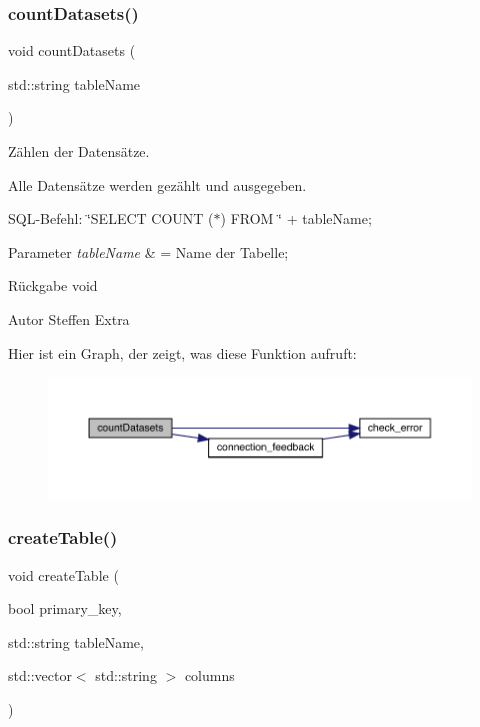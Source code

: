 \subsubsection{count\+Datasets()}
{\footnotesize\ttfamily void count\+Datasets (\begin{DoxyParamCaption}\item[{std\+::string}]{table\+Name }\end{DoxyParamCaption})}



Zählen der Datensätze. 

Alle Datensätze werden gezählt und ausgegeben.~\newline


S\+Q\+L-\/\+Befehl\+: \char`\"{}\+S\+E\+L\+E\+C\+T C\+O\+U\+N\+T ($\ast$) F\+R\+O\+M \char`\"{} + table\+Name;


\begin{DoxyParams}{Parameter}
{\em table\+Name} & = Name der Tabelle;\\
\hline
\end{DoxyParams}
\begin{DoxyReturn}{Rückgabe}
void
\end{DoxyReturn}
\begin{DoxyAuthor}{Autor}
Steffen Extra 
\end{DoxyAuthor}
Hier ist ein Graph, der zeigt, was diese Funktion aufruft\+:\nopagebreak
\begin{figure}[H]
\begin{center}
\leavevmode
\includegraphics[width=350pt]{tables_8hpp_ad2178bf4577d7eea6caebd8d1c942088_cgraph}
\end{center}
\end{figure}
\mbox{\label{tables_8hpp_a018659fc814b4a097c4b4862f42fe554}} 
\subsubsection{create\+Table()}
{\footnotesize\ttfamily void create\+Table (\begin{DoxyParamCaption}\item[{bool}]{primary\+\_\+key,  }\item[{std\+::string}]{table\+Name,  }\item[{std\+::vector$<$ std\+::string $>$}]{columns }\end{DoxyParamCaption})}

